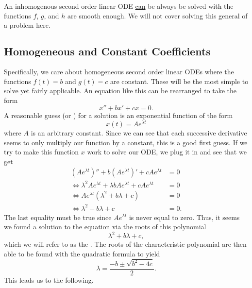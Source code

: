         \begin{remark}
        An inhomogenous second order linear ODE \underline{can} be always be solved with the functions $f$, $g$, and $h$ are smooth enough.  We will not cover solving this general of a problem here.
        \end{remark}
        
        \subsection{Homogeneous and Constant Coefficients}
        Specifically, we care about homogeneous second order linear ODEs where the functions $f(t)=b$ and $g(t)=c$ are constant.  These will be the most simple to solve yet fairly applicable. An equation like this can be rearranged to take the form
        \[
        x''+bx'+cx=0.
        \]
        A reasonable guess (or ) for a solution is an exponential function of the form
        \[
        x(t)=Ae^{\lambda t}
        \]
        where $A$ is an arbitrary constant. Since we can see that each successive derivative seems to only multiply our function by a constant, this is a good first guess. If we try to make this function $x$ work to solve our ODE, we plug it in and see that we get
        \begin{align*}
            \left(Ae^{\lambda t}\right)''+b\left(Ae^{\lambda t}\right)'+cAe^{\lambda t}&=0\\
            \iff\lambda^2 Ae^{\lambda t}+\lambda b Ae^{\lambda t} +c Ae^{\lambda t}&=0\\
            \iff Ae^{\lambda t}\left( \lambda^2 + b\lambda +c\right)&=0\\
            \iff \lambda^2 +b\lambda +c &=0.
        \end{align*}
        The last equality must be true since $Ae^{\lambda t}$ is never equal to zero.  Thus, it seems we found a solution to the equation via the roots of this polynomial
        \[
        \lambda^2+b\lambda +c,
        \]
        which we will refer to as the . The roots of the characteristic polynomial are then able to be found with the quadratic formula to yield
        \[
        \lambda=\frac{-b\pm \sqrt{b^2-4c}}{2}.
        \]
        This leads us to the following.
        

